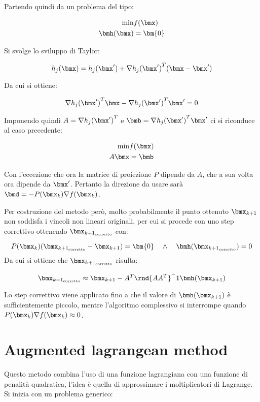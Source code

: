 \documentclass[\main/main.tex]{subfiles}
\begin{document}
Partendo quindi da un problema del tipo:

\begin{align*}
    \min &f(\bmx)\\
    \bmh(\bmx) &= \bm{0}
\end{align*}

Si svolge lo sviluppo di Taylor:

\[
    h_j(\bmx) = h_j(\bmx') + \nabla {h_j(\bmx')}^T(\bmx-\bmx')
\]

Da cui si ottiene:

\[
    \nabla {h_j(\bmx')}^T\bmx - \nabla {h_j(\bmx')}^T\bmx' = 0
\]

Imponendo quindi \(A = \nabla {h_j(\bmx')}^T\) e \(\bmb = \nabla {h_j(\bmx')}^T\bmx'\) ci si riconduce al caso precedente:

\begin{align*}
    \min &f(\bmx)\\
    A\bmx &= \bmb
\end{align*}

Con l'eccezione che ora la matrice di proiezione \(P\) dipende da \(A\), che a sua volta ora dipende da \(\bmx'\). Pertanto la direzione da usare sarà \(\bmd = -P(\bmx_k)\nabla f(\bmx_k)\).

Per costruzione del metodo però, molto probabilmente il punto ottenuto \(\bmx_{k+1}\) non soddisfa i vincoli non lineari originali, per cui si procede con uno step correttivo ottenendo \(\bmx_{{k+1}_{\text{corretto}}}\) con:

\[
    P(\bmx_k)(\bmx_{{k+1}_{\text{corretto}}}-\bmx_{k+1}) = \bm{0} \quad \land \quad \bmh(\bmx_{{k+1}_{\text{corretto}}}) = 0
\]
Da cui si ottiene che \(\bmx_{{k+1}_{\text{corretto}}}\) risulta:

\[
    \bmx_{{k+1}_{\text{corretto}}} \approx \bmx_{k+1} - A^T\rnd{AA^T}^-1 \bmh(\bmx_{k+1})
\]

Lo step correttivo viene applicato fino a che il valore di \(\bmh(\bmx_{k+1})\) è sufficientemente piccolo, mentre l'algoritmo complessivo si interrompe quando \(P(\bmx_k)\nabla f(\bmx_k) \approx 0\).

\section{Augmented lagrangean method}
Questo metodo combina l'uso di una funzione lagrangiana con una funzione di penalità quadratica, l'idea è quella di approssimare i moltiplicatori di Lagrange. Si inizia con un problema generico:
\end{document}
